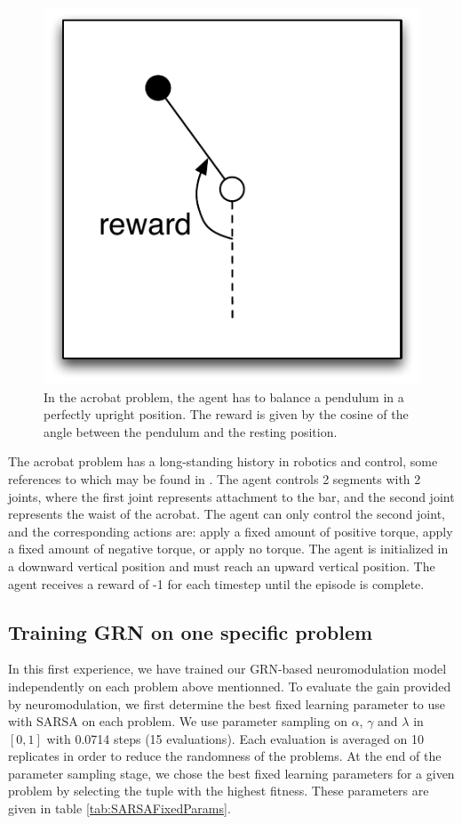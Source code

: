 \begin{figure}[h]
\center
\includegraphics[width=0.5\linewidth]{ACP_problem.pdf}
\caption{In the acrobat problem, the agent has to balance a pendulum in a perfectly upright position. The reward is given by the cosine of the angle between the pendulum and the resting position.}\label{fig:MC:problem}
\end{figure}

The acrobat problem has a long-standing history in robotics and control, some references to which may be found in \cite{sutton1998introduction}. The agent controls 2 segments with 2 joints, where the first joint represents attachment to the bar, and the second joint represents the waist of the acrobat. The agent can only control the second joint, and the corresponding actions are: apply a fixed amount of positive torque, apply a fixed amount of negative torque, or apply no torque. The agent is initialized in a downward vertical position and must reach an upward vertical position. The agent receives a reward of -1 for each timestep until the episode is complete.

\subsection{Training GRN on one specific problem}
In this first experience, we have trained our GRN-based neuromodulation model independently on each problem above mentionned. To evaluate the gain provided by neuromodulation, we first determine the best fixed learning parameter to use with SARSA on each problem. We use parameter sampling on $\alpha$, $\gamma$ and $\lambda$ in $[0, 1]$ with 0.0714 steps (15 evaluations). Each evaluation is averaged on 10 replicates in order to reduce the randomness of the problems. At the end of the parameter sampling stage, we chose the best fixed learning parameters for a given problem by selecting the tuple with the highest fitness. These parameters are given in table \ref{tab:SARSAFixedParams}.

